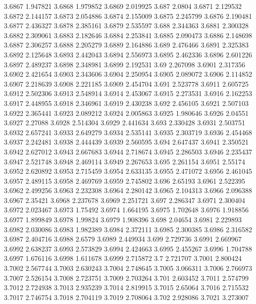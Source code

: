 3.6867  1.947821
3.6868  1.979852
3.6869  2.019925
3.687  2.0804
3.6871  2.129532
3.6872  2.144157
3.6873  2.054886
3.6874  2.155009
3.6875  2.245799
3.6876  2.190481
3.6877  2.436327
3.6878  2.385161
3.6879  2.535597
3.688  2.344363
3.6881  2.300328
3.6882  2.309061
3.6883  2.182646
3.6884  2.253841
3.6885  2.090473
3.6886  2.148698
3.6887  2.306257
3.6888  2.205279
3.6889  2.164886
3.689  2.476466
3.6891  2.325383
3.6892  2.125648
3.6893  2.442043
3.6894  2.556973
3.6895  2.462336
3.6896  2.601226
3.6897  2.489237
3.6898  2.348981
3.6899  2.192531
3.69  2.267098
3.6901  2.317356
3.6902  2.421654
3.6903  2.343606
3.6904  2.250954
3.6905  2.089072
3.6906  2.114852
3.6907  2.218639
3.6908  2.221185
3.6909  2.454704
3.691  2.523778
3.6911  2.605725
3.6912  2.502306
3.6913  2.548914
3.6914  2.453067
3.6915  2.273531
3.6916  2.162253
3.6917  2.448955
3.6918  2.346961
3.6919  2.430238
3.692  2.456105
3.6921  2.507103
3.6922  2.365441
3.6923  2.089212
3.6924  2.005863
3.6925  1.980646
3.6926  2.04551
3.6927  2.27088
3.6928  2.514304
3.6929  2.441634
3.693  2.330428
3.6931  2.503751
3.6932  2.657241
3.6933  2.649279
3.6934  2.535141
3.6935  2.303719
3.6936  2.454468
3.6937  2.242481
3.6938  2.444439
3.6939  2.560595
3.694  2.647437
3.6941  2.350521
3.6942  2.627012
3.6943  2.667683
3.6944  2.718674
3.6945  2.286503
3.6946  2.235437
3.6947  2.521748
3.6948  2.469114
3.6949  2.267653
3.695  2.261154
3.6951  2.55174
3.6952  2.620892
3.6953  2.715459
3.6954  2.633135
3.6955  2.471072
3.6956  2.461045
3.6957  2.489115
3.6958  2.469769
3.6959  2.745802
3.696  2.65193
3.6961  2.522395
3.6962  2.499256
3.6963  2.232308
3.6964  2.280142
3.6965  2.104313
3.6966  2.096388
3.6967  2.35421
3.6968  2.237678
3.6969  2.251721
3.697  2.286347
3.6971  2.300404
3.6972  2.023467
3.6973  1.75492
3.6974  1.664195
3.6975  1.702648
3.6976  1.918856
3.6977  1.899849
3.6978  1.99824
3.6979  1.908396
3.698  2.04654
3.6981  2.229893
3.6982  2.030086
3.6983  1.982389
3.6984  2.372111
3.6985  2.300385
3.6986  2.316582
3.6987  2.404716
3.6988  2.6579
3.6989  2.449934
3.699  2.729736
3.6991  2.669967
3.6992  2.638237
3.6993  2.573829
3.6994  2.424663
3.6995  2.455267
3.6996  1.704788
3.6997  1.676116
3.6998  1.611678
3.6999  2.715872
3.7  2.721707
3.7001  2.800424
3.7002  2.567744
3.7003  2.630243
3.7004  2.748645
3.7005  3.066311
3.7006  2.766973
3.7007  2.526154
3.7008  2.723751
3.7009  2.703264
3.701  2.603452
3.7011  2.574799
3.7012  2.724938
3.7013  2.935239
3.7014  2.819915
3.7015  2.65064
3.7016  2.715532
3.7017  2.746754
3.7018  2.704119
3.7019  2.708064
3.702  2.928086
3.7021  3.273007
